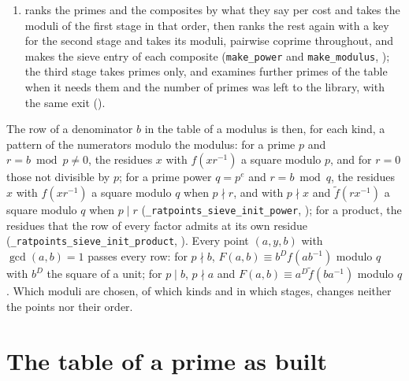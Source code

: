 \begin{enumerate}
    candidates (\verb|add_moduli|, ); for a factor $p^e$ with
    $e \ge 2$, \verb|examine_power| () computes the coefficients
    modulo $q = p^e$, the squares modulo $q$, for each residue $x$ whether $f(x)$ is a square modulo
    $q$, for each multiple $t$ of $p$ whether the reversed polynomial
    $\tilde f(t) = \sum_k c_k t^{D - k}$ is one, and the inverses modulo $q$ of the units, by the
    extended Euclidean algorithm (\verb|modinv|, );
  \item ranks the primes and the composites by what they say per cost and takes the moduli of the
    first stage in that order, then ranks the rest again with a key for the second stage and takes
    its moduli, pairwise coprime throughout, and makes the sieve entry of each composite
    (\verb|make_power| and \verb|make_modulus|, ); the third
    stage takes primes only, and examines further primes of the table when it needs them and the
    number of primes was left to the library, with the same exit
    ().
\end{enumerate}
The row of a denominator $b$ in the table of a modulus is then, for each kind, a pattern of the
numerators modulo the modulus: for a prime $p$ and $r = b \bmod p \ne 0$, the residues $x$ with
$f(x r^{-1})$ a square modulo $p$, and for $r = 0$ those not divisible by $p$; for a prime power
$q = p^e$ and $r = b \bmod q$, the residues $x$ with $f(x r^{-1})$ a square modulo $q$ when
$p \nmid r$, and with $p \nmid x$ and $\tilde f(r x^{-1})$ a square modulo $q$ when $p \mid r$
(\verb|_ratpoints_sieve_init_power|, ); for a product, the residues that
the row of every factor admits at its own residue (\verb|_ratpoints_sieve_init_product|,
). Every point $(a, y, b)$ with $\gcd(a, b) = 1$ passes every row: for
$p \nmid b$, $F(a, b) \equiv b^D f(a b^{-1})$ modulo $q$ with $b^D$ the square of a unit; for
$p \mid b$, $p \nmid a$ and $F(a, b) \equiv a^D \tilde f(b a^{-1})$ modulo $q$. Which moduli are
chosen, of which kinds and in which stages, changes neither the points nor their order.

\section{The table of a prime as built}\label{sec:tableBuilt}

